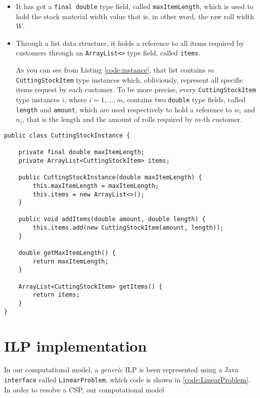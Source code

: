 \documentclass[10pt,a4paper]{article}
\begin{document}
\begin{itemize}
\item It has got a \texttt{final double} type field, called \texttt{maxItemLength}, which is used to hold the stock material width value that is, in other word, the raw roll width $W$.

\item Through a list data structure, it holds a reference to all items required by customers through an \texttt{ArrayList<>} type field, called \texttt{items}. 

As you can see from Listing \ref{code:instance}, that list contains $m$ \texttt{CuttingStockItem} type instances which, obliviously, represent all specific items request by each customer. To be more precise, every \texttt{CuttingStockItem} type instances $i$, where $i = 1,...,m$, contains two \texttt{double} type fields, called \texttt{length} and \texttt{amount}, which are used respectively to hold a reference to $w_i$ and $n_i$, that is the length and the amount of rolls required by $m$-th customer. 
\end{itemize}

\begin{lstlisting}[frame=lines, caption={\texttt{CuttingStockInstance} class implementation.}, label={code:instance}]
public class CuttingStockInstance {

    private final double maxItemLength;
    private ArrayList<CuttingStockItem> items;

    public CuttingStockInstance(double maxItemLength) {
        this.maxItemLength = maxItemLength;
        this.items = new ArrayList<>();
    }

    public void addItems(double amount, double length) {
        this.items.add(new CuttingStockItem(amount, length));
    }

    double getMaxItemLength() {
        return maxItemLength;
    }

    ArrayList<CuttingStockItem> getItems() {
        return items;
    }
}
\end{lstlisting}

\section{ILP implementation}

In our computational model, a \textit{generic} ILP is been represented using a Java \texttt{interface} called \texttt{LinearProblem}, which code is shown in \ref{code:LinearProblem}. In order to resolve a CSP, our computational model 
\end{document}
